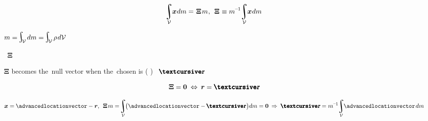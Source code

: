\[
\hspace{-0.4ex} \integral_{\mathcal{V}} \hspace{-0.6ex} \bm{x} \hspace{.1ex} dm = \hspace{.15ex} \bm{\Xi} \hspace{.2ex} m
\hspace{.1ex} , \:\:
\bm{\Xi} \hspace{.1ex} \equiv m^{\hspace{-0.1ex}\expminusone} \hspace{-0.5ex} \integral_{\mathcal{V}} \hspace{-0.6ex} \bm{x} \hspace{.1ex} dm
\]

 ${m = \hspace{-0.25ex}\scalebox{1.4}{$\integral$}_{\hspace{-0.55ex}\mathcal{V}} \hspace{.3ex} dm = \hspace{-0.25ex}\scalebox{1.4}{$\integral$}_{\hspace{-0.55ex}\mathcal{V}} \hspace{.3ex} \rho \hspace{.2ex} d\mathcal{V}}$

\hbox{~\hspace{.2ex}}$\bm{\Xi}$

$\bm{\Xi}$ becomes the~null vector when the~chosen  is  ( ) ~${\mathboldrcursive}$

\[
\bm{\Xi} = \bm{0}
\hspace{.6ex} \Leftrightarrow \hspace{.5ex}
\locationvector = \mathboldrcursive
\]

\[
\bm{x} = \hspace{-0.1ex} \advancedlocationvector - \locationvector
, \hspace{1ex}
\bm{\Xi} \hspace{.2ex} m = \hspace{-0.4ex} \integral_{\mathcal{V}} \hspace{-0.4ex} \bigl( \advancedlocationvector - \hspace{-0.1ex} \mathboldrcursive \hspace{.15ex} \bigr) dm = \bm{0}
\hspace{.5ex} \Rightarrow \hspace{.6ex}
\mathboldrcursive = m^{\hspace{-0.1ex}\expminusone} \hspace{-0.5ex} \integral_{\mathcal{V}} \hspace{-0.7ex} \advancedlocationvector \hspace{.25ex} dm
\]

